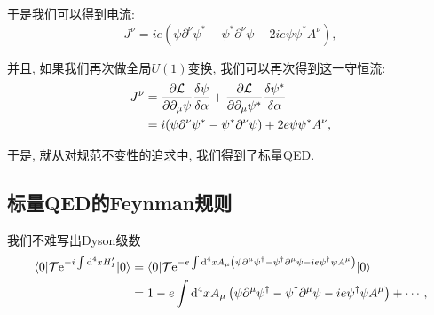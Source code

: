 于是我们可以得到电流:
\begin{equation}
    J^\nu=ie(\psi\partial^\nu\psi^*-\psi^*\partial^\nu\psi-2ie\psi\psi^*A^\nu),
\end{equation}

并且, 如果我们再次做全局$U(1)$变换, 我们可以再次得到这一守恒流:
\begin{align}
    J^\nu&=\frac{\partial \mathcal L}{\partial \partial_\mu\psi}\frac{\delta\psi}{\delta\alpha}+\frac{\partial \mathcal L}{\partial \partial_\mu\psi^*}\frac{\delta\psi^*}{\delta\alpha}\\
    &=i(\psi\partial^\nu\psi^*-\psi^*\partial^\nu\psi)+2e\psi\psi^*A^\nu,
\end{align}

于是, 就从对规范不变性的追求中, 我们得到了标量QED. 

\subsection{标量QED的Feynman规则}\label{SQED-feynman}
我们不难写出Dyson级数
\begin{align}
    \braket{0|\mathcal T\mathrm e^{-i\int\mathrm d^4x H_I'}|0}&=\braket{0|\mathcal T\mathrm e^{-e\int\mathrm d^4xA_\mu\left(\psi\partial^\mu\psi^\dagger-\psi^\dagger\partial^\mu\psi-ie\psi^\dagger\psi A^\mu\right)}|0}\\
    &=1-e\int\mathrm d^4xA_\mu\left(\psi\partial^\mu\psi^\dagger-\psi^\dagger\partial^\mu\psi-ie\psi^\dagger\psi A^\mu\right)+\cdots,
\end{align}

